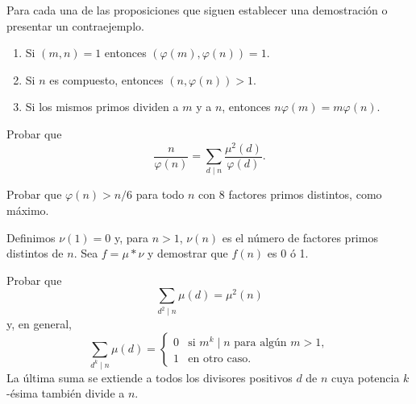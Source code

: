 \documentclass[12pt,a4paper]{book}
\begin{document}
    \begin{ejercicio}
        Para cada una de las proposiciones que siguen establecer una demostración o
        presentar un contraejemplo.
        \begin{enumerate}
            \item[(a)] Si $(m,n)=1$ entonces $(\varphi(m),\varphi(n))=1$.
            \item[(b)] Si $n$ es compuesto, entonces $(n,\varphi(n))>1$.
            \item[(c)] Si los mismos primos dividen a $m$ y a $n$, entonces
            $n\varphi(m)=m\varphi(n)$.
        \end{enumerate}
    \end{ejercicio}

    \begin{ejercicio}
        Probar que
        \begin{equation*}
            \frac{n}{\varphi(n)}=\sum_{d\mid n}\frac{\mu^{2}(d)}{\varphi(d)}.
        \end{equation*}
    \end{ejercicio}

    \begin{ejercicio}
        Probar que $\varphi(n)>n/6$ para todo $n$ con 8 factores primos distintos, como
        máximo.
    \end{ejercicio}

    \begin{ejercicio}
        Definimos $\nu(1)=0$ y, para $n>1$, $\nu(n)$ es el número de factores primos
        distintos de $n$. Sea $f=\mu*\nu$ y demostrar que $f(n)$ es 0 ó 1.
    \end{ejercicio}

    \begin{ejercicio}
        Probar que
        \begin{equation*}
            \sum_{d^{2}\mid n}\mu(d)=\mu^{2}(n)
        \end{equation*}
        y, en general,
        \begin{equation*}
            \sum_{d^{k}\mid n}\mu(d)=
            \begin{cases}
                0 & \text{si } m^{k}\mid n \text{ para algún } m>1,\\
                1 & \text{en otro caso.}
            \end{cases}
        \end{equation*}
        La última suma se extiende a todos los divisores positivos $d$ de $n$ cuya potencia
        $k$-ésima también divide a $n$.
    \end{ejercicio}
\end{document}
